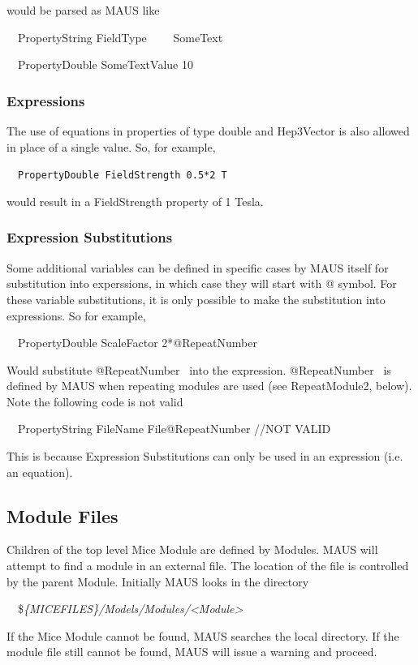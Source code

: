 would be parsed as MAUS like

{\ttfamily
\ \ PropertyString FieldType \ \ \ \ SomeText}

{\ttfamily
\ \ PropertyDouble SomeTextValue 10}

\subsubsection{Expressions}
The use of equations in properties of type double and Hep3Vector is also allowed in place of a single value. So, for
example, 

\ \ \texttt{PropertyDouble FieldStrength 0.5*2 T}

would result in a FieldStrength property of 1 Tesla.\texttt{ }

\subsubsection{Expression Substitutions}
Some additional variables can be defined in specific cases by MAUS itself for substitution into experssions, in which
case they will start with @ symbol. For these variable substitutions, it is only possible to make the substitution into
expressions. So for example,

{\ttfamily
\ \ PropertyDouble ScaleFactor 2*@RepeatNumber}

Would substitute @RepeatNumber \ into the expression. @RepeatNumber \ is defined by MAUS when repeating modules are
used (see RepeatModule2, below). Note the following code is not valid

{\ttfamily
\ \ PropertyString FileName File@RepeatNumber //NOT VALID}

This is because Expression Substitutions can only be used in an expression (i.e. an equation).

\subsection[Module Files]{Module Files}
Children of the top level Mice Module are defined by Modules. MAUS will attempt to find a module in an external file.
The location of the file is controlled by the parent Module. Initially MAUS looks in the directory

\ \ \$\textit{\{MICEFILES\}/Models/Modules/{\textless}Module{\textgreater}}

If the Mice Module cannot be found, MAUS searches the local directory. If the module file still cannot be found,
MAUS will issue a warning and proceed.


